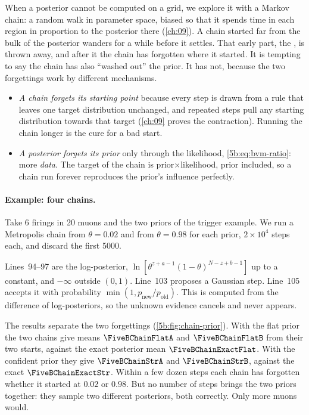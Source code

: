 When a posterior cannot be computed on a grid, we explore it with a Markov chain: a
random walk in parameter space, biased so that it spends time in each region in
proportion to the posterior there (\cref{ch:09}). A chain started far from the bulk of
the posterior wanders for a while before it settles. That early part, the
, is thrown away, and after it the chain has forgotten where it
started. It is tempting to say the chain has also ``washed out'' the prior. It has not,
because the two forgettings work by different mechanisms.
\begin{itemize}
  \item \emph{A chain forgets its starting point} because every step is drawn from a
        rule that leaves one target distribution unchanged, and repeated steps pull any
        starting distribution towards that target (\cref{ch:09} proves the contraction).
        Running the chain longer is the cure for a bad start.
  \item \emph{A posterior forgets its prior} only through the likelihood,
        \eqref{5b:eq:bvm-ratio}: more \emph{data}. The target of the chain is
        prior$\times$likelihood, prior included, so a chain run forever reproduces the
        prior's influence perfectly.
\end{itemize}

\paragraph{Example: four chains.} Take 6 firings in 20 muons and the two priors of the
trigger example. We run a Metropolis chain  from $\theta=0.02$ and from
$\theta=0.98$ for each prior, $2\times10^4$ steps each, and discard the first 5000.


Lines~94--97 are the log-posterior, $\ln[\theta^{z+a-1}(1-\theta)^{N-z+b-1}]$ up to a
constant, and $-\infty$ outside $(0,1)$. Line~103 proposes a Gaussian step. Line~105
accepts it with probability $\min(1,p_{\text{new}}/p_{\text{old}})$. This is computed
from the difference of log-posteriors, so the unknown evidence cancels and never
appears.

The results separate the two forgettings (\cref{5b:fig:chain-prior}). With the flat
prior the two chains give means $\FiveBChainFlatA$ and $\FiveBChainFlatB$ from their two
starts, against the exact posterior mean $\FiveBChainExactFlat$. With the confident prior
they give $\FiveBChainStrA$ and $\FiveBChainStrB$, against the exact
$\FiveBChainExactStr$. Within a few dozen steps each chain has forgotten whether it
started at $0.02$ or $0.98$. But no number of steps brings the two priors together:
they sample two different posteriors, both correctly. Only more muons would.

